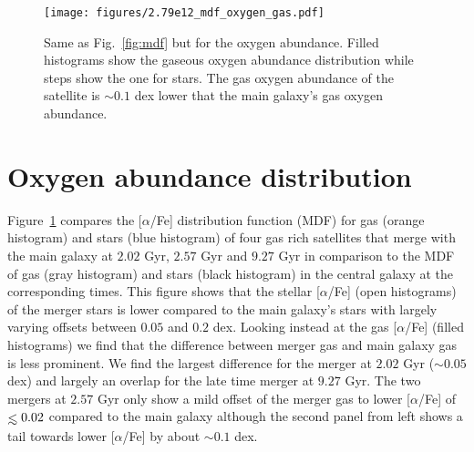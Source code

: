 \documentclass[useAMS,usenatbib]{mnras}
\def\lesssim{\mathrel{\hbox{\rlap{\hbox{\lower4pt\hbox{$\sim$}}}\hbox{$<$}}}}
\begin{document}
\begin{figure}
    \begin{centering}
        \texttt{[image: figures/2.79e12\_mdf\_oxygen\_gas.pdf]}
        \vspace*{-1.75em}
        \caption{
            Same as Fig.~\ref{fig:mdf} but for the oxygen abundance. Filled histograms show the gaseous oxygen abundance distribution while steps show the one for stars. The gas oxygen abundance of the satellite is  $\sim0.1$ dex lower that the main galaxy's gas oxygen abundance.
        }
        \label{fig:mdf_oxygen}
    \end{centering}
\end{figure}

\section{Oxygen abundance distribution}

Figure~\ref{fig:mdf_oxygen} compares the [$\alpha$/Fe] distribution function (MDF) for gas (orange histogram) and stars (blue histogram) of four gas rich satellites that merge with the main galaxy at $2.02$ Gyr, $2.57$ Gyr and $9.27$ Gyr in comparison to the MDF of gas (gray histogram) and stars (black histogram) in the central galaxy at the corresponding times.
This figure shows that the stellar [$\alpha$/Fe] (open histograms) of the merger stars is lower compared to the main galaxy's stars with largely varying offsets between $0.05$ and $0.2$ dex. Looking instead at the gas [$\alpha$/Fe] (filled histograms) we find that the difference between merger gas and main galaxy gas is less prominent. We find the largest difference for the merger at $2.02$ Gyr ($\sim0.05$ dex) and largely an overlap for the late time merger at $9.27$ Gyr. The two mergers at $2.57$ Gyr only show a mild offset of the merger gas to lower [$\alpha$/Fe] of $\lesssim0.02$ compared to the main galaxy although the second panel from left shows a tail towards lower [$\alpha$/Fe] by about $\sim0.1$ dex.




\label{lastpage}
\end{document}
